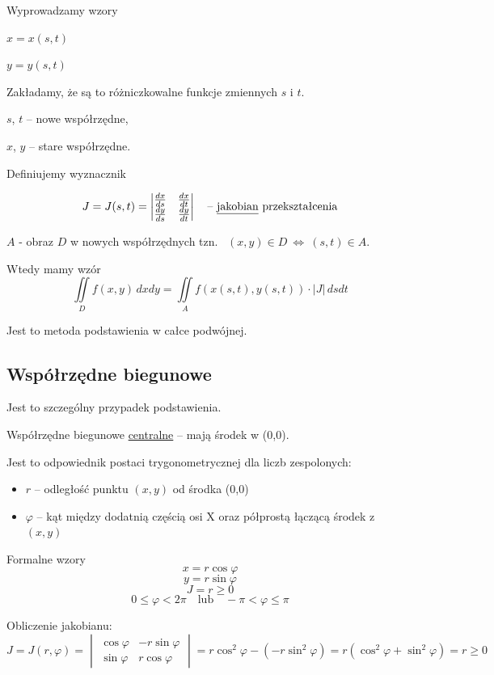 Wyprowadzamy wzory

$ x = x(s,t) $

$ y = y(s,t) $

Zakładamy, że są to różniczkowalne funkcje zmiennych $s$ i $t$.

$s$, $t$ -- nowe współrzędne,

$x$, $y$ -- stare współrzędne.

Definiujemy wyznacznik

\[ J = J(s,t) = \begin{vmatrix}
    \frac{dx}{ds} & \frac{dx}{dt} \\
    \frac{dy}{ds} & \frac{dy}{dt}
\end{vmatrix} \textrm{\quad -- \underline{jakobian} przekształcenia} \]

$A$ - obraz $D$ w nowych współrzędnych tzn. \ $ (x,y) \in D \ \Leftrightarrow \ (s,t) \in A $.

Wtedy mamy wzór
\[ \iint\limits_D f(x,y) \, dxdy = \iint\limits_A f(x(s,t), y(s,t)) \cdot |J|\, dsdt \]

Jest to metoda podstawienia w całce podwójnej.


\subsection*{Współrzędne biegunowe}

Jest to szczególny przypadek podstawienia.

Współrzędne biegunowe \underline{centralne} -- mają środek w (0,0).

Jest to odpowiednik postaci trygonometrycznej dla liczb zespolonych:
\begin{itemize}
    \item $r$ -- odległość punktu $(x,y)$ od środka (0,0)
    \item $\varphi$ -- kąt między dodatnią częścią osi X oraz półprostą łączącą środek z $(x,y)$
\end{itemize}

\begin{tw}{Formalne wzory}
\[ x = r \cos \varphi \]
\[ y = r \sin \varphi \]
\[ J = r \geq 0 \]
\[ 0 \leq \varphi < 2 \pi \quad \textrm{lub} \quad -\pi < \varphi \leq \pi \]

Obliczenie jakobianu:
\[ J = J(r, \varphi) = \begin{vmatrix}
    \cos \varphi & -r \sin \varphi \\
    \sin \varphi & r \cos \varphi
\end{vmatrix} = r \cos^2 \varphi - (- r \sin^2 \varphi) = r(\cos^2 \varphi + \sin^2 \varphi) = r \geq 0 \]

\end{tw}

